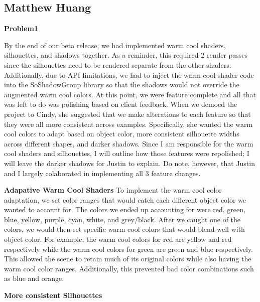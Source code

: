 \documentclass[10pt,journal,compsoc,draftclsnofoot]{IEEEtran}
\begin{document}
\begin{flushleft}
\newpage

\subsection{Matthew Huang}
\textbf{Problem1}
\par
By the end of our beta release, we had implemented warm cool shaders, silhouettes, and shadows together.
As a reminder, this required 2 render passes since the silhouettes need to be rendered separate from the other shaders.
Additionally, due to API limitations, we had to inject the warm cool shader code into the SoShadowGroup library so that the shadows would not override the augmented warm cool colors.
At this point, we were feature complete and all that was left to do was polishing based on client feedback.
When we demoed the project to Cindy, she suggested that we make alterations to each feature so that they were all more consistent across examples.
Specifically, she wanted the warm cool colors to adapt based on object color, more consistent silhouette widths across different shapes, and darker shadows.
Since I am responsible for the warm cool shaders and silhouettes, I will outline how those features were repolished; I will leave the darker shadows for Justin to explain.
Do note, however, that Justin and I largely colaborated in implementing all 3 feature changes.
\vspace{3mm}

\textbf{Adapative Warm Cool Shaders}
To implement the warm cool color adaptation, we set color ranges that would catch each different object color we wanted to account for.
The colors we ended up accounting for were red, green, blue, yellow, purple, cyan, white, and grey/black.
After we caught one of the colors, we would then set specific warm cool colors that would blend well with object color.
For example, the warm cool colors for red are yellow and red respectively while the warm cool colors for green are green and blue respectively.
This allowed the scene to retain much of its original colors while also having the warm cool color ranges.
Additionally, this prevented bad color combinations such as blue and orange.

\vspace{3mm}

\textbf{More consistent Silhouettes}


\end{flushleft}
\end{document}
